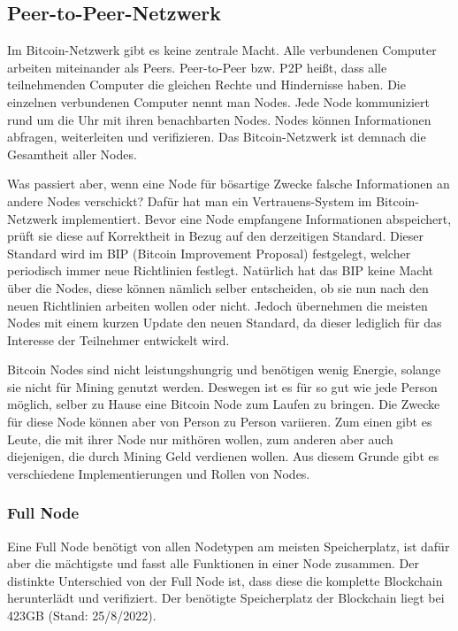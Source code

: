 \subsection{Peer-to-Peer-Netzwerk}
Im Bitcoin-Netzwerk gibt es keine zentrale Macht. Alle verbundenen Computer arbeiten miteinander als Peers. Peer-to-Peer
bzw. P2P heißt, dass alle teilnehmenden Computer die gleichen Rechte und Hindernisse haben. Die einzelnen verbundenen Computer
nennt man Nodes. Jede Node kommuniziert rund um die Uhr mit ihren benachbarten Nodes. Nodes können Informationen abfragen, 
weiterleiten und verifizieren. Das Bitcoin-Netzwerk ist demnach die Gesamtheit aller Nodes.

Was passiert aber, wenn eine Node für bösartige Zwecke falsche Informationen an andere Nodes verschickt? Dafür hat man ein
Vertrauens-System im Bitcoin-Netzwerk implementiert. Bevor eine Node empfangene Informationen abspeichert, prüft sie diese
auf Korrektheit in Bezug auf den derzeitigen Standard. Dieser Standard wird im BIP (Bitcoin Improvement Proposal) festgelegt,
welcher periodisch immer neue Richtlinien festlegt.  Natürlich hat das BIP keine Macht über die Nodes, diese können nämlich
selber entscheiden, ob sie nun nach den neuen Richtlinien arbeiten wollen oder nicht. Jedoch übernehmen die meisten Nodes mit
einem kurzen Update den neuen Standard, da dieser lediglich für das Interesse der Teilnehmer entwickelt wird.

Bitcoin Nodes sind nicht leistungshungrig und benötigen wenig Energie, solange sie nicht für Mining genutzt werden. Deswegen ist
es für so gut wie jede Person möglich,
selber zu Hause eine Bitcoin Node zum Laufen zu bringen. Die Zwecke für diese Node können aber von Person zu Person variieren.
Zum einen gibt es Leute, die mit ihrer Node nur mithören wollen, zum anderen aber auch diejenigen, die durch Mining Geld
verdienen wollen. Aus diesem Grunde gibt es verschiedene Implementierungen und Rollen von Nodes.

\subsubsection{Full Node}
Eine Full Node benötigt von allen Nodetypen am meisten Speicherplatz, ist dafür aber die mächtigste und fasst alle Funktionen in 
einer Node zusammen. Der distinkte Unterschied von der Full Node ist, dass diese die komplette Blockchain herunterlädt und
verifiziert. Der benötigte Speicherplatz der Blockchain liegt bei 423GB (Stand: 25/8/2022).

